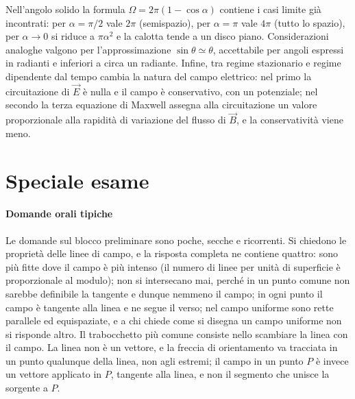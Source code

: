 \documentclass[main.tex]{subfiles}
\begin{document}
Nell'angolo solido la formula $\Omega=2\pi(1-\cos\alpha)$ contiene i casi limite già incontrati: per $\alpha=\pi/2$ vale $2\pi$ (semispazio), per $\alpha=\pi$ vale $4\pi$ (tutto lo spazio), per $\alpha\to0$ si riduce a $\pi\alpha^2$ e la calotta tende a un disco piano. Considerazioni analoghe valgono per l'approssimazione $\sin\theta\simeq\theta$, accettabile per angoli espressi in radianti e inferiori a circa un radiante. Infine, tra regime stazionario e regime dipendente dal tempo cambia la natura del campo elettrico: nel primo la circuitazione di $\vec E$ è nulla e il campo è conservativo, con un potenziale; nel secondo la terza equazione di Maxwell assegna alla circuitazione un valore proporzionale alla rapidità di variazione del flusso di $\vec B$, e la conservatività viene meno.

\medskip

\section*{Speciale esame}
\paragraph*{Domande orali tipiche}
Le domande sul blocco preliminare sono poche, secche e ricorrenti. Si chiedono le proprietà delle linee di campo, e la risposta completa ne contiene quattro: sono più fitte dove il campo è più intenso (il numero di linee per unità di superficie è proporzionale al modulo); non si intersecano mai, perché in un punto comune non sarebbe definibile la tangente e dunque nemmeno il campo; in ogni punto il campo è tangente alla linea e ne segue il verso; nel campo uniforme sono rette parallele ed equispaziate, e a chi chiede come si disegna un campo uniforme non si risponde altro. Il trabocchetto più comune consiste nello scambiare la linea con il campo. La linea non è un vettore, e la freccia di orientamento va tracciata in un punto qualunque della linea, non agli estremi; il campo in un punto $P$ è invece un vettore applicato in $P$, tangente alla linea, e non il segmento che unisce la sorgente a $P$.
\end{document}
